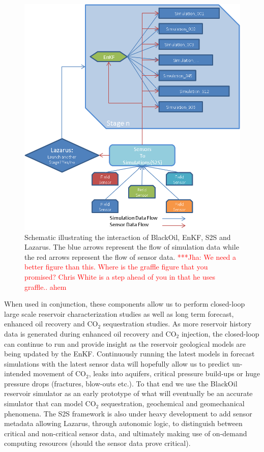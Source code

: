\documentclass{rspublic}
\newcommand{\jhanote}[1]{ {\textcolor{red} { ***Jha: #1 }}}
\newcommand{\jhanote}[1]{}
\begin{document}
\begin{figure}
\begin{center}
\includegraphics*[scale=0.7,angle=0]{figures/Picture2.png}
\end{center}
\caption{Schematic illustrating the interaction of BlackOil, EnKF, S2S
  and Lazarus. The blue arrows represent the flow of simulation data
  while the red arrows represent the flow of sensor data. \jhanote{We
    need a better figure than this. Where is the graffle figure that
    you promised? Chris White is a step ahead of you in that he uses
    graffle.. ahem}}
\label{fig:irregular_execution}
\end{figure}

When used in conjunction, these components allow us to perform
closed-loop large scale reservoir characterization studies as well as
long term forecast, enhanced oil recovery and CO$_2$ sequestration
studies. As more reservoir history data is generated during enhanced
oil recovery and CO$_2$ injection, the closed-loop can continue to run
and provide insight as the reservoir geological models are being
updated by the EnKF.  Continuously running the latest models in
forecast simulations with the latest sensor data will hopefully allow
us to predict un-intended movement of CO$_2$, leaks into aquifers,
critical pressure build-ups or huge pressure drops (fractures,
blow-outs etc.). To that end we use the BlackOil reservoir simulator
as an early prototype of what will eventually be an accurate simulator
that can model CO$_2$ sequestration, geochemical and geomechanical
phenomena. The S2S framework is also under heavy development to add
sensor metadata allowing Lazarus, through autonomic logic, to
distinguish between critical and non-critical sensor data, and
ultimately making use of on-demand computing resources (should the
sensor data prove critical).
\end{document}
